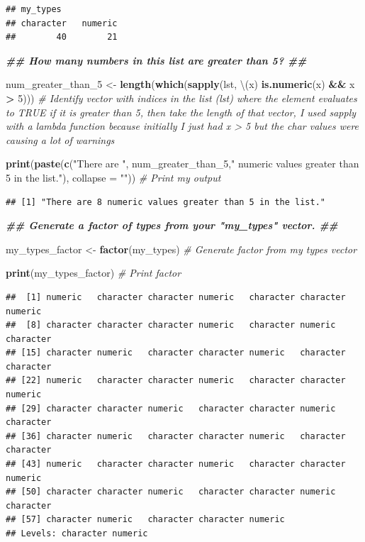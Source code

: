 \documentclass[
]{article}
\newenvironment{Shaded}{\begin{snugshade}}{\end{snugshade}}
\newcommand{\AttributeTok}[1]{\textcolor[rgb]{0.13,0.29,0.53}{#1}}
\newcommand{\CommentTok}[1]{\textcolor[rgb]{0.56,0.35,0.01}{\textit{#1}}}
\newcommand{\DecValTok}[1]{\textcolor[rgb]{0.00,0.00,0.81}{#1}}
\newcommand{\DocumentationTok}[1]{\textcolor[rgb]{0.56,0.35,0.01}{\textbf{\textit{#1}}}}
\newcommand{\FunctionTok}[1]{\textcolor[rgb]{0.13,0.29,0.53}{\textbf{#1}}}
\newcommand{\NormalTok}[1]{#1}
\newcommand{\OtherTok}[1]{\textcolor[rgb]{0.56,0.35,0.01}{#1}}
\newcommand{\SpecialCharTok}[1]{\textcolor[rgb]{0.81,0.36,0.00}{\textbf{#1}}}
\newcommand{\StringTok}[1]{\textcolor[rgb]{0.31,0.60,0.02}{#1}}
\begin{document}
\begin{verbatim}
## my_types
## character   numeric 
##        40        21
\end{verbatim}

\begin{Shaded}
\begin{Highlighting}[]
\DocumentationTok{\#\# How many numbers in this list are greater than 5? \#\#}

\NormalTok{num\_greater\_than\_5 }\OtherTok{\textless{}{-}} \FunctionTok{length}\NormalTok{(}\FunctionTok{which}\NormalTok{(}\FunctionTok{sapply}\NormalTok{(lst, \textbackslash{}(x) }\FunctionTok{is.numeric}\NormalTok{(x) }\SpecialCharTok{\&\&}\NormalTok{ x }\SpecialCharTok{\textgreater{}} \DecValTok{5}\NormalTok{))) }\CommentTok{\# Identify vector with indices in the list (lst) where the element evaluates to TRUE if it is greater than 5, then take the length of that vector, I used sapply with a lambda function because initially I just had x \textgreater{} 5 but the char values were causing a lot of warnings}

\FunctionTok{print}\NormalTok{(}\FunctionTok{paste}\NormalTok{(}\FunctionTok{c}\NormalTok{(}\StringTok{"There are "}\NormalTok{, num\_greater\_than\_5,}\StringTok{" numeric values greater than 5 in the list."}\NormalTok{), }\AttributeTok{collapse =} \StringTok{""}\NormalTok{)) }\CommentTok{\# Print my output}
\end{Highlighting}
\end{Shaded}

\begin{verbatim}
## [1] "There are 8 numeric values greater than 5 in the list."
\end{verbatim}

\begin{Shaded}
\begin{Highlighting}[]
\DocumentationTok{\#\# Generate a factor of types from your "my\_types" vector. \#\#}

\NormalTok{my\_types\_factor }\OtherTok{\textless{}{-}} \FunctionTok{factor}\NormalTok{(my\_types) }\CommentTok{\# Generate factor from my types vector}

\FunctionTok{print}\NormalTok{(my\_types\_factor) }\CommentTok{\# Print factor}
\end{Highlighting}
\end{Shaded}

\begin{verbatim}
##  [1] numeric   character character numeric   character character numeric  
##  [8] character character character numeric   character numeric   character
## [15] character numeric   character character numeric   character character
## [22] numeric   character character numeric   character character numeric  
## [29] character character numeric   character character numeric   character
## [36] character numeric   character character numeric   character character
## [43] numeric   character character numeric   character character numeric  
## [50] character character numeric   character character numeric   character
## [57] character numeric   character character numeric  
## Levels: character numeric
\end{verbatim}
\end{document}
